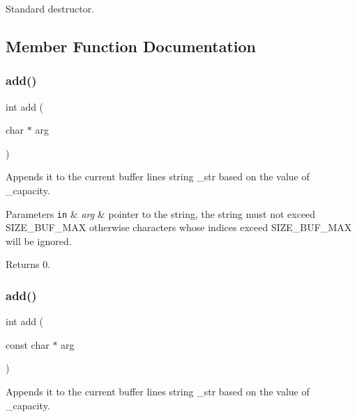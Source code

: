 Standard destructor. 



\subsection{Member Function Documentation}
\mbox{\label{classmessage_ade996ea0a39cac012e455bb82c1bd88f}} 
\subsubsection{\texorpdfstring{add()}{add()}\hspace{0.1cm}{\footnotesize\ttfamily [1/2]}}
{\footnotesize\ttfamily int add (\begin{DoxyParamCaption}\item[{char $\ast$}]{arg }\end{DoxyParamCaption})}



Appends it to the current buffer line\textquotesingle{}s string \+\_\+str based on the value of \+\_\+capacity. 


\begin{DoxyParams}[1]{Parameters}
\mbox{\tt in}  & {\em arg} & pointer to the string, the string must not exceed S\+I\+Z\+E\+\_\+\+B\+U\+F\+\_\+\+M\+AX otherwise characters whose indices exceed S\+I\+Z\+E\+\_\+\+B\+U\+F\+\_\+\+M\+AX will be ignored. \\
\hline
\end{DoxyParams}
\begin{DoxyReturn}{Returns}
0. 
\end{DoxyReturn}
\mbox{\label{classmessage_a86ea56f1017e712e5b721013f1bdfb49}} 
\subsubsection{\texorpdfstring{add()}{add()}\hspace{0.1cm}{\footnotesize\ttfamily [2/2]}}
{\footnotesize\ttfamily int add (\begin{DoxyParamCaption}\item[{const char $\ast$}]{arg }\end{DoxyParamCaption})}



Appends it to the current buffer line\textquotesingle{}s string \+\_\+str based on the value of \+\_\+capacity. 


